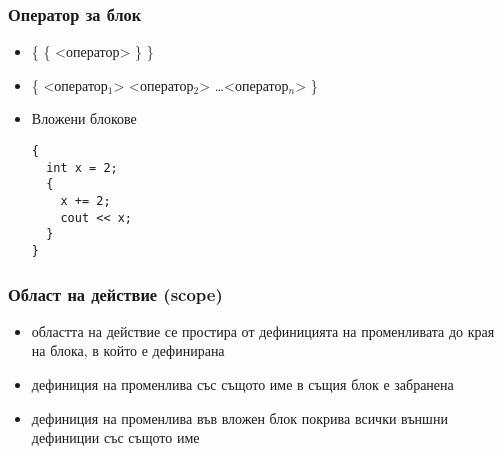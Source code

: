 \documentclass{beamer}
\begin{document}
\begin{frame}[fragile]
  \frametitle{Оператор за блок}

  \begin{itemize}[<+->]
  \item \tta\{ \{ <оператор> \} \tta\}
  \item \tta\{ <оператор$_1$> <оператор$_2$> \ldots <оператор$_n$> \tta\}
  \item Вложени блокове\\
\begin{lstlisting}
{
  int x = 2;
  {
    x += 2;
    cout << x;
  }
}
\end{lstlisting}
  \end{itemize}
\end{frame}

\begin{frame}
  \frametitle{Област на действие (scope)}

  \begin{itemize}[<+->]
  \item областта на действие се простира от дефиницията на
    променливата до края на блока, в който е дефинирана
  \item дефиниция на променлива със същото име в същия блок е
    забранена
  \item дефиниция на променлива във вложен блок покрива всички външни
    дефиниции със същото име
  \end{itemize}
\end{frame}
\end{document}
